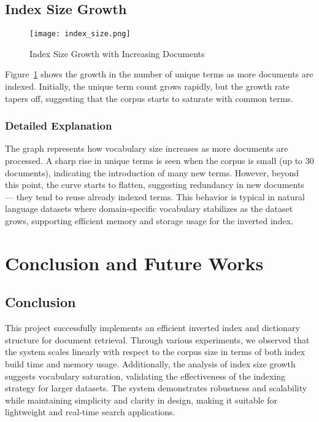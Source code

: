 \documentclass[conference]{IEEEtran}
\begin{document}
\subsection{Index Size Growth}
\begin{figure}[htbp]
    \centering
    \texttt{[image: index\_size.png]}
    \caption{Index Size Growth with Increasing Documents}
    \label{fig:index-size}
\end{figure}
Figure~\ref{fig:index-size} shows the growth in the number of unique terms as more documents are indexed. Initially, the unique term count grows rapidly, but the growth rate tapers off, suggesting that the corpus starts to saturate with common terms.

\subsubsection*{Detailed Explanation}
The graph represents how vocabulary size increases as more documents are processed. A sharp rise in unique terms is seen when the corpus is small (up to 30 documents), indicating the introduction of many new terms. However, beyond this point, the curve starts to flatten, suggesting redundancy in new documents — they tend to reuse already indexed terms. This behavior is typical in natural language datasets where domain-specific vocabulary stabilizes as the dataset grows, supporting efficient memory and storage usage for the inverted index.

\section{Conclusion and Future Works}

\subsection*{Conclusion}
This project successfully implements an efficient inverted index and dictionary structure for document retrieval. Through various experiments, we observed that the system scales linearly with respect to the corpus size in terms of both index build time and memory usage. Additionally, the analysis of index size growth suggests vocabulary saturation, validating the effectiveness of the indexing strategy for larger datasets. The system demonstrates robustness and scalability while maintaining simplicity and clarity in design, making it suitable for lightweight and real-time search applications.
\end{document}
